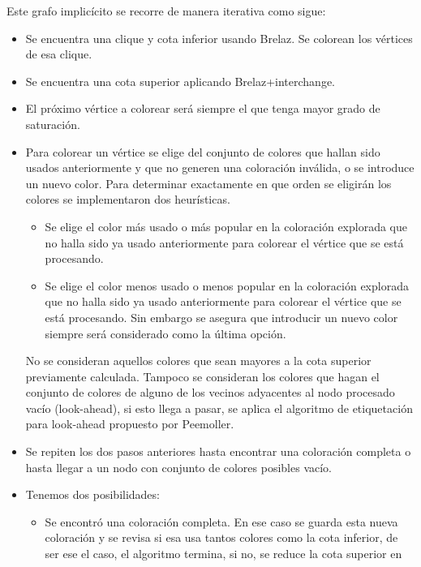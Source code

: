 \documentclass[a4paper,10pt]{article}
\begin{document}
\indent Este grafo implic\'icito se recorre de manera iterativa como sigue:
\begin{itemize}
 \item Se encuentra una clique y cota inferior usando Brelaz. Se colorean los
       v\'ertices de esa clique.
 \item Se encuentra una cota superior aplicando Brelaz+interchange.
 \item El pr\'oximo v\'ertice a colorear ser\'a siempre el que tenga
       mayor grado de saturaci\'on.
 \item Para colorear un v\'ertice se elige del conjunto de colores que hallan
       sido usados anteriormente y que no generen una coloraci\'on
       inv\'alida, o se introduce un nuevo color. Para determinar exactamente
       en que orden se eligir\'an los colores se implementaron dos heur\'isticas.
       \begin{itemize}
	\item Se elige el color m\'as usado o m\'as popular en la coloraci\'on
	      explorada que no halla sido ya usado anteriormente para
	      colorear el v\'ertice que se est\'a procesando. 
	\item Se elige el color menos usado o menos popular en la
	      coloraci\'on explorada que no halla sido ya usado
	      anteriormente para colorear el v\'ertice que se est\'a
	      procesando. Sin embargo se asegura que introducir un nuevo
	      color siempre ser\'a considerado como la \'ultima opci\'on.
       \end{itemize}
       No se consideran aquellos colores que sean mayores a la cota
       superior previamente calculada. Tampoco se consideran los colores
       que hagan el conjunto de colores de alguno de los vecinos
       adyacentes al nodo procesado vac\'io (look-ahead), si esto llega
       a pasar, se aplica el algoritmo de etiquetaci\'on para look-ahead
       propuesto por Peemoller.
\item Se repiten los dos pasos anteriores hasta encontrar una
      coloraci\'on completa o hasta llegar a un nodo con conjunto de
      colores posibles vac\'io.
\item Tenemos dos posibilidades:
      \begin{itemize}
	\item Se encontr\'o una coloraci\'on completa. En ese caso se
	      guarda esta nueva coloraci\'on y se revisa si esa usa
	      tantos colores como la cota inferior, de ser ese el caso,
	      el algoritmo termina, si no, se reduce la cota superior en

\end{itemize}
\end{itemize}
\end{document}
